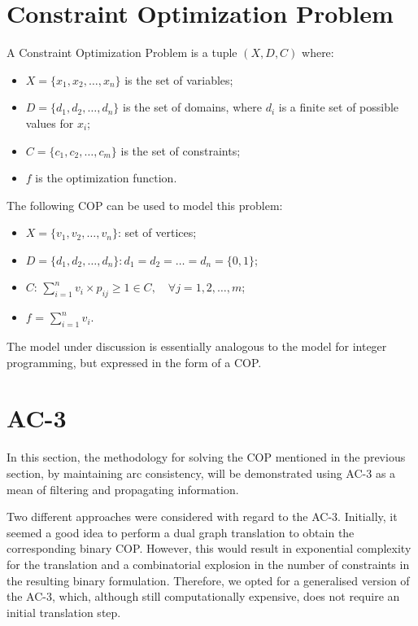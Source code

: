 \documentclass{report}
\begin{document}
\section{Constraint Optimization Problem}
A Constraint Optimization Problem is a tuple $(X, D, C)$ where:
\begin{itemize}
    \item $X = \{x_1, x_2, \dots, x_n\}$ is the set of variables;
    \item $D = \{d_1, d_2, \dots, d_n\}$ is the set of domains, where $d_i$ is a finite set of possible values for $x_i$;
    \item $C = \{c_1, c_2, \dots, c_m\}$ is the set of constraints;
    \item $f$ is the optimization function.
\end{itemize}

The following COP can be used to model this problem:

\begin{itemize}
  \item $X = \{v_1, v_2, \dots, v_{n}\}$: set of vertices;
    \item $D = \{d_1, d_2, \dots, d_{n}\}: d_1 = d_2 = \dots = d_{n} = \{0,1\}$;
    \item $C$: \(\sum_{i = 1}^n v_i \times p_{ij} \ge 1 \in C, \quad \forall j = 1,2,\dots,m \);
    \item $f$ = \(\sum_{i = 1}^n v_i\). 
\end{itemize}

The model under discussion is essentially analogous to the model for integer programming, but expressed in the form of a COP.
\section{AC-3}
In this section, the methodology for solving the COP mentioned in the previous section, by maintaining arc consistency, will be demonstrated using AC-3 as a mean of filtering and propagating information.

Two different approaches were considered with regard to the AC-3. Initially, it seemed a good idea to perform a dual graph translation to obtain the corresponding binary COP. However, this would result in exponential complexity for the translation and a combinatorial explosion in the number of constraints in the resulting binary formulation. Therefore, we opted for a generalised version of the AC-3, which, although still computationally expensive, does not require an initial translation step.
\end{document}
